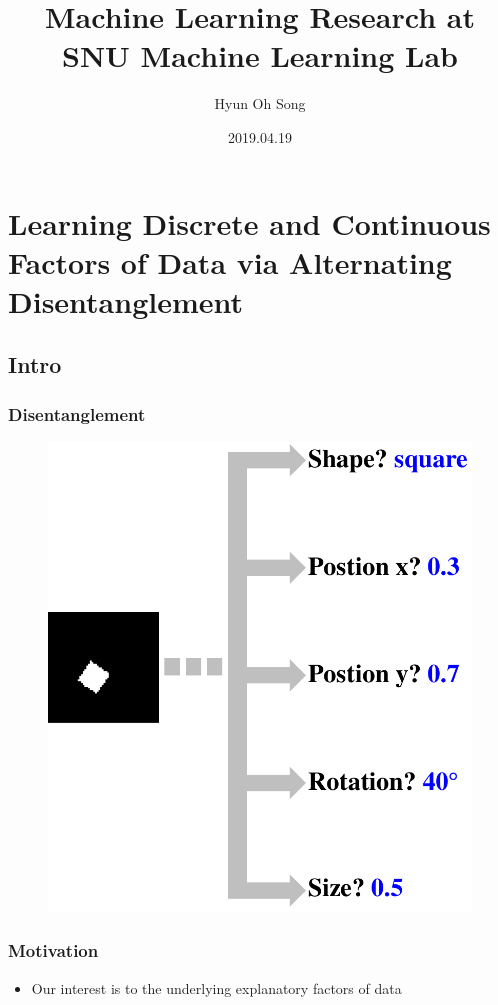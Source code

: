 \documentclass[10pt,mathserif]{beamer}
\title{Machine Learning Research at SNU Machine Learning Lab}
\author{Hyun Oh Song}
\institute
    {Seoul National University}
\date{2019.04.19}
\begin{document}
\begin{frame}
  \titlepage
\end{frame}

\section{Learning Discrete and Continuous Factors of Data via Alternating Disentanglement}
\subsection{Intro}

\begin{frame}
\frametitle{Disentanglement}
\begin{figure}
\centering
\includegraphics[width=0.6\linewidth]{dis_asset/disentanglement}
\end{figure}
\end{frame}

\begin{frame}
\frametitle{Motivation}
\begin{itemize}\itemsep=20pt
\item Our interest is to {\color{blue}{disentangle}} the underlying explanatory factors of data {\color{blue}{without any supervision.}}
\end{itemize}
\end{frame}
\end{document}
